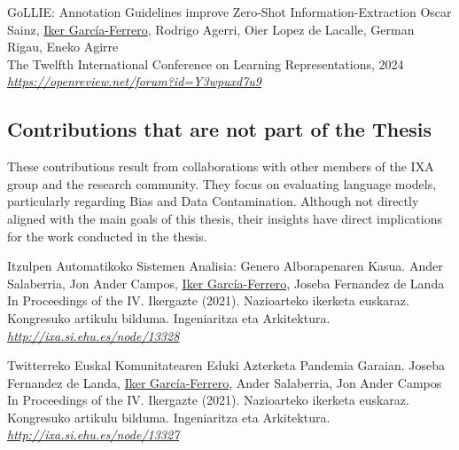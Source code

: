 \begin{not_part_of_the_thesis}{	
     GoLLIE: Annotation Guidelines improve Zero-Shot Information-Extraction}
    Oscar Sainz, \underline{Iker García-Ferrero}, Rodrigo Agerri, Oier Lopez de Lacalle, German Rigau, Eneko Agirre \\
    The Twelfth International Conference on Learning Representations, 2024 \\
    \textit{\href{https://openreview.net/forum?id=Y3wpuxd7u9}{https://openreview.net/forum?id=Y3wpuxd7u9}}
\end{not_part_of_the_thesis}

\clearpage
 
\subsection{Contributions that are not part of the Thesis}
These contributions result from collaborations with other members of the IXA group and the research community. They focus on evaluating language models, particularly regarding Bias and Data Contamination. Although not directly aligned with the main goals of this thesis, their insights have direct implications for the work conducted in the thesis. 

\begin{not_part_of_the_thesis}{Itzulpen Automatikoko Sistemen Analisia: Genero Alborapenaren Kasua.}
    Ander Salaberria, Jon Ander Campos, \underline{Iker García-Ferrero}, Joseba Fernandez de Landa \\
    In Proceedings of the IV. Ikergazte (2021). Nazioarteko ikerketa euskaraz. Kongresuko artikulu bilduma. Ingeniaritza eta Arkitektura. \\
    \textit{\href{http://ixa.si.ehu.es/node/13328}{http://ixa.si.ehu.es/node/13328}}
\end{not_part_of_the_thesis}

\begin{not_part_of_the_thesis}{Twitterreko Euskal Komunitatearen Eduki Azterketa Pandemia Garaian.}
    Joseba Fernandez de Landa, \underline{Iker García-Ferrero}, Ander Salaberria, Jon Ander Campos \\
    In Proceedings of the IV. Ikergazte (2021). Nazioarteko ikerketa euskaraz. Kongresuko artikulu bilduma. Ingeniaritza eta Arkitektura. \\
    \textit{\href{http://ixa.si.ehu.es/node/13327}{http://ixa.si.ehu.es/node/13327}}
\end{not_part_of_the_thesis}

